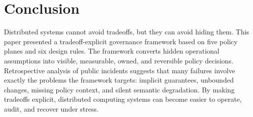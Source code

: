 \documentclass[conference]{IEEEtran}
\begin{document}
\section{Conclusion}

Distributed systems cannot avoid tradeoffs, but they can avoid hiding them. This paper presented a tradeoff-explicit governance framework based on five policy planes and six design rules. The framework converts hidden operational assumptions into visible, measurable, owned, and reversible policy decisions. Retrospective analysis of public incidents suggests that many failures involve exactly the problems the framework targets: implicit guarantees, unbounded changes, missing policy context, and silent semantic degradation. By making tradeoffs explicit, distributed computing systems can become easier to operate, audit, and recover under stress.
\end{document}
